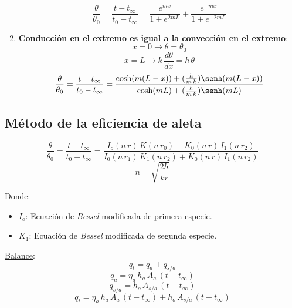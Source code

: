 \begin{enumerate}
\begin{equation}
            \frac{\theta}{\theta_0} = \frac{t - t_{\infty}}{t_0 - t_{\infty}} = \frac{e^{mx}}{1 + e^{2mL}} + \frac{e^{-mx}}{1 + e^{-2mL}}
        \end{equation}
    \item \textbf{Conducción en el extremo es igual a la convección en el extremo}:
        \begin{equation*}
            x = 0 \rightarrow \theta = \theta_0
        \end{equation*}
        \begin{equation*}
            x = L \rightarrow k\,\frac{d\theta}{dx} = h\,\theta
        \end{equation*}
        \begin{equation}
            \frac{\theta}{\theta_0} = \dfrac{t - t_{\infty}}{t_0 - t_{\infty}} = \frac{\cosh(m(L-x))+(\frac{h}{m\,k})\senh(m(L-x))}{\cosh(mL)+(\frac{h}{m\,k})\senh(mL)}
        \end{equation}
\end{enumerate}

\subsection{Método de la eficiencia de aleta}


\begin{equation}
    \frac{\theta}{\theta_0} = \dfrac{t - t_{\infty}}{t_0 - t_{\infty}} = \frac{I_o(n\,r)\,K(n\,r_0)+K_0(n\,r)\,I_1(n\,r_2)}{I_0(n\,r_1)\,K_1(n\,r_2)+K_0(n\,r)\,I_1(n\,r_2)}
\end{equation}
\begin{equation*}
    n = \sqrt{\frac{2h}{kr}}
\end{equation*}

Donde:
\begin{itemize}
    \item $I_o$: Ecuación de \emph{Bessel} modificada de primera especie.
    \item $K_1$: Ecuación de \emph{Bessel} modificada de segunda especie.
\end{itemize}

\underline{Balance}:
\begin{equation*}
    q_t = q_a + q_{s/a}
\end{equation*}
\begin{equation*}
    q_a = \eta_a\,h_a\,A_a\,(t - t_{\infty})
\end{equation*}
\begin{equation*}
    q_{s/a} = h_o\,A_{s/a}\,(t - t_{\infty})
\end{equation*}
\begin{equation*}
    q_t = \eta_a\,h_a\,A_a\,(t - t_{\infty}) + h_o\,A_{s/a}\,(t - t_{\infty})
\end{equation*}

